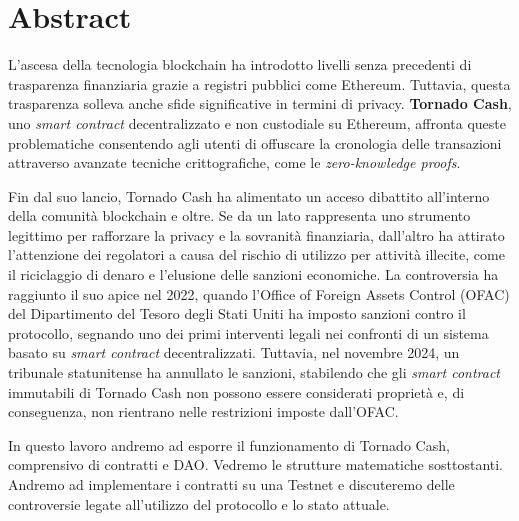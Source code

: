 \chapter{Abstract}

L’ascesa della tecnologia blockchain ha introdotto livelli senza precedenti di trasparenza finanziaria grazie a registri pubblici come Ethereum. Tuttavia, questa trasparenza solleva anche sfide significative in termini di privacy. \textbf{Tornado Cash}, uno \textit{smart contract} decentralizzato e non custodiale su Ethereum, affronta queste problematiche consentendo agli utenti di offuscare la cronologia delle transazioni attraverso avanzate tecniche crittografiche, come le \textit{zero-knowledge proofs}.  

Fin dal suo lancio, Tornado Cash ha alimentato un acceso dibattito all’interno della comunità blockchain e oltre. Se da un lato rappresenta uno strumento legittimo per rafforzare la privacy e la sovranità finanziaria, dall’altro ha attirato l’attenzione dei regolatori a causa del rischio di utilizzo per attività illecite, come il riciclaggio di denaro e l’elusione delle sanzioni economiche. La controversia ha raggiunto il suo apice nel 2022, quando l’Office of Foreign Assets Control (OFAC) del Dipartimento del Tesoro degli Stati Uniti ha imposto sanzioni contro il protocollo\cite{treasury2023}, segnando uno dei primi interventi legali nei confronti di un sistema basato su \textit{smart contract} decentralizzati. Tuttavia, nel novembre 2024, un tribunale statunitense ha annullato le sanzioni, stabilendo che gli \textit{smart contract} immutabili di Tornado Cash non possono essere considerati proprietà e, di conseguenza, non rientrano nelle restrizioni imposte dall'OFAC.

In questo lavoro andremo ad esporre il funzionamento di Tornado Cash, comprensivo di contratti e DAO. Vedremo le strutture matematiche sosttostanti. Andremo ad implementare i contratti su una Testnet e discuteremo delle controversie legate all'utilizzo del protocollo e lo stato attuale. 
